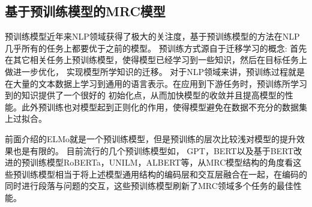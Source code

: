 \subsection{基于预训练模型的MRC模型}
预训练模型近年来NLP领域获得了极大的关注度，基于预训练模型的方法在NLP几乎所有的任务上都要优于之前的模型。
预训练方式源自于迁移学习的概念: 首先在其它相关任务上预训练模型，使得模型已经学习到一些知识，然后在目标任务上做进一步优化，
实现模型所学知识的迁移。
对于NLP领域来讲，预训练过程就是在大量的文本数据上学习到通用的语言表示。在应用到下游任务时，预训练所学习到的知识提供了一个很好的
初始化点，从而加快模型的收敛并且提高模型的性能。此外预训练也对模型起到正则化的作用，使得模型避免在数据不充分的数据集上过拟合。

前面介绍的ELMo就是一个预训练模型，但是预训练的层次比较浅对模型的提升效果也是有限的。
目前流行的几个预训练模型如，
GPT，BERT以及基于BERT改进的预训练模型RoBERTa，UNILM，ALBERT等，从MRC模型结构的角度看这些预训练模型相当于将上述模型通用结构的编码层和交互层融合在一起，在编码的同时进行段落与问题的交互，这些预训练模型刷新了MRC领域多个任务的最佳性能。

